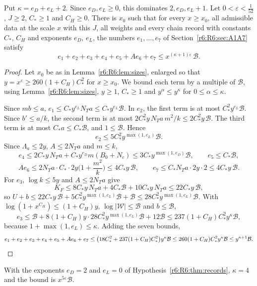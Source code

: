 \begin{proposition}\label{r6:R6:prop:errors}
Put $\kappa=e_D+e_L+2$. Since $e_D,e_L\ge0$, this dominates $2,e_D,e_L+1$. Let $0<\varepsilon<\frac1{52}$, $J\ge2$, $C_\ast\ge1$ and $C_H\ge0$. There is $x_0$ such that for every $x\ge x_0$, all admissible data at the scale $x$ with this $J$, all weights and every chain record with constants $C_\ast$, $C_H$ and exponents $e_D$, $e_L$, the numbers $e_1,\dots,e_7$ of Section~\ref{r6:R6:sec:A1A7} satisfy
\[
e_1+e_2+e_3+e_4+e_5+Ae_6+e_7\le x^{(\kappa+1)\varepsilon}\,\mathcal B .
\]
\end{proposition}

\begin{proof}
Let $x_0$ be as in Lemma~\ref{r6:R6:lem:sizes}, enlarged so that $y=x^\varepsilon\ge260(1+C_H)C_\ast^2$ for $x\ge x_0$. We bound each term by a multiple of $\mathcal B$, using Lemma~\ref{r6:R6:lem:sizes}, $y\ge1$, $C_\ast\ge1$ and $y^\alpha\le y^\kappa$ for $0\le\alpha\le\kappa$.

Since $mb\le a$, $e_1\le C_\ast y^{e_L}N_Ta\le C_\ast y^{e_L}\mathcal B$. In $e_2$, the first term is at most $C_\ast^2y^{e_L}\mathcal B$. Since $b'\le a/k$, the second term is at most $2C_\ast^2y\,N_Ta\,m^2/k\le2C_\ast^2y\,\mathcal B$. The third term is at most $C_\ast a\le C_\ast\mathcal B$, and $1\le\mathcal B$. Hence
\[
e_2\le5C_\ast^2y^{\max(1,e_L)}\mathcal B .
\]
Since $\Lambda_a\le2y$, $A\le2N_Ta$ and $m\le k$,
\[
e_4\le2C_\ast y\,N_Ta+C_\ast y^{e_D}m(B_0+N_c)\le3C_\ast y^{\max(1,e_D)}\mathcal B,\qquad e_5\le C_\ast\mathcal B,
\]
\[
Ae_6\le2N_Ta\cdot C_\ast\cdot2y\Big(1+\frac{m^2}k\Big)\le4C_\ast y\,\mathcal B,\qquad e_7\le C_\ast N_Ta\cdot2y\cdot2\le4C_\ast y\,\mathcal B .
\]
For $e_3$, $\log k\le5y$ and $A\le2N_Ta$ give
\[
K_F\le8C_\ast y\,N_Ta+4C_\ast\mathcal B+10C_\ast y\,N_Ta\le22C_\ast y\,\mathcal B,
\]
so $U+b\le22C_\ast y\,\mathcal B+5C_\ast^2y^{\max(1,e_L)}\mathcal B+\mathcal B\le28C_\ast^2y^{\max(1,e_L)}\mathcal B$. With $\log(1+x^{C_H})\le(1+C_H)y$, $\log\lvert\mathcal W\rvert\le\mathcal B$ and $b\le\mathcal B$,
\[
e_3\le\mathcal B+8(1+C_H)y\cdot28C_\ast^2y^{\max(1,e_L)}\mathcal B+12\mathcal B\le237(1+C_H)C_\ast^2y^{\kappa}\mathcal B,
\]
because $1+\max(1,e_L)\le\kappa$. Adding the seven bounds,
\[
e_1+e_2+e_3+e_4+e_5+Ae_6+e_7\le\big(18C_\ast^2+237(1+C_H)C_\ast^2\big)y^\kappa\mathcal B\le260(1+C_H)C_\ast^2y^\kappa\mathcal B\le y^{\kappa+1}\mathcal B .\qedhere
\]
\end{proof}

With the exponents $e_D=2$ and $e_L=0$ of Hypothesis~\ref{r6:R6:thm:records}, $\kappa=4$ and the bound is $x^{5\varepsilon}\mathcal B$.

